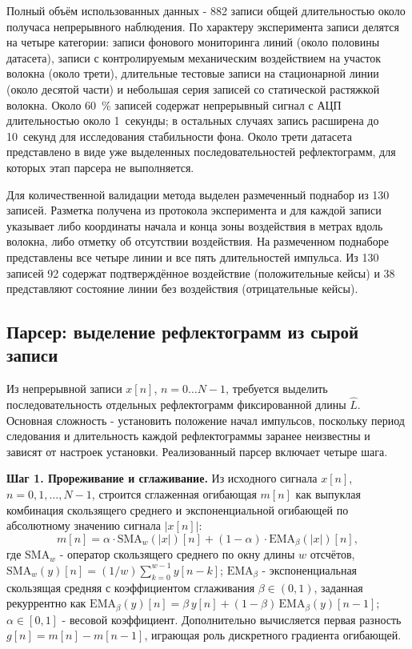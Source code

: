 \documentclass[12pt,a4paper]{extarticle}
\begin{document}
Полный объём использованных данных - 882 записи общей длительностью около получаса непрерывного наблюдения. По характеру эксперимента записи делятся на четыре категории: записи фонового мониторинга линий (около половины датасета), записи с контролируемым механическим воздействием на участок волокна (около трети), длительные тестовые записи на стационарной линии (около десятой части) и небольшая серия записей со статической растяжкой волокна. Около 60~\% записей содержат непрерывный сигнал с АЦП длительностью около 1~секунды; в остальных случаях запись расширена до 10~секунд для исследования стабильности фона. Около трети датасета представлено в виде уже выделенных последовательностей рефлектограмм, для которых этап парсера не выполняется.

Для количественной валидации метода выделен размеченный поднабор из 130 записей. Разметка получена из протокола эксперимента и для каждой записи указывает либо координаты начала и конца зоны воздействия в метрах вдоль волокна, либо отметку об отсутствии воздействия. На размеченном поднаборе представлены все четыре линии и все пять длительностей импульса. Из 130 записей 92 содержат подтверждённое воздействие (положительные кейсы) и 38 представляют состояние линии без воздействия (отрицательные кейсы).

\subsection{Парсер: выделение рефлектограмм из сырой записи}
\label{sec:parser}

Из непрерывной записи $x[n]$, $n = 0\dots N-1$, требуется выделить последовательность отдельных рефлектограмм фиксированной длины $\hat{L}$. Основная сложность - установить положение начал импульсов, поскольку период следования и длительность каждой рефлектограммы заранее неизвестны и зависят от настроек установки. Реализованный парсер включает четыре шага.

\textbf{Шаг 1. Прореживание и сглаживание.} Из исходного сигнала $x[n]$, $n = 0, 1, \dots, N-1$, строится сглаженная огибающая $m[n]$ как выпуклая комбинация скользящего среднего и экспоненциальной огибающей по абсолютному значению сигнала $|x[n]|$:
\begin{equation}
  m[n] = \alpha \cdot \mathrm{SMA}_w(|x|)[n] + (1-\alpha) \cdot \mathrm{EMA}_\beta(|x|)[n],
\end{equation}
где $\mathrm{SMA}_w$ - оператор скользящего среднего по окну длины $w$ отсчётов, $\mathrm{SMA}_w(y)[n] = (1/w) \sum_{k=0}^{w-1} y[n-k]$; $\mathrm{EMA}_\beta$ - экспоненциальная скользящая средняя с коэффициентом сглаживания $\beta \in (0, 1)$, заданная рекуррентно как $\mathrm{EMA}_\beta(y)[n] = \beta\,y[n] + (1-\beta)\,\mathrm{EMA}_\beta(y)[n-1]$; $\alpha \in [0, 1]$ - весовой коэффициент. Дополнительно вычисляется первая разность $g[n] = m[n] - m[n-1]$, играющая роль дискретного градиента огибающей.
\end{document}

